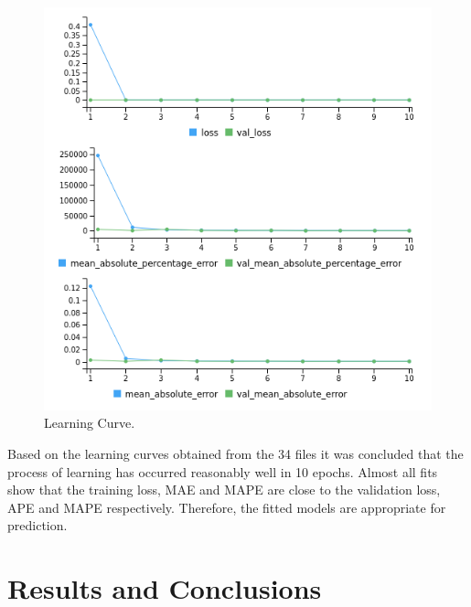 \documentclass[%
aip,
amsmath,amssymb,
reprint,%
]{revtex4-1}
\begin{document}
\begin{figure}[h!]
	\includegraphics[width=\linewidth]{learning.png}
	\caption{Learning Curve.}
	\label{fig:learning}
\end{figure}

Based on the learning curves obtained from the 34 files it was concluded that the process of learning has occurred reasonably well in 10 epochs. Almost all fits show that the training loss, MAE and MAPE are close to the validation loss, APE and MAPE respectively. Therefore, the fitted models are appropriate for prediction.

\section{Results and Conclusions}
\end{document}
